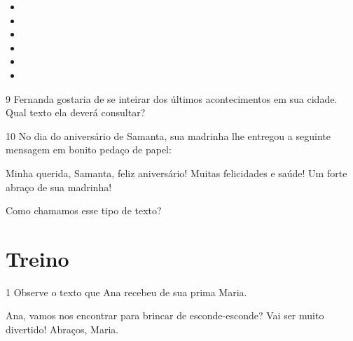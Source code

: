 \begin{itemize}
\item {}

\item \reduline{\mbox{}\hfill}

\item \reduline{\mbox{}\hfill}

\item \reduline{\mbox{}\hfill}

\item \reduline{\mbox{}\hfill}

\item \reduline{\mbox{}\hfill}

\end{itemize}

\num{9} Fernanda gostaria de se inteirar dos últimos acontecimentos em sua cidade. Qual texto ela deverá consultar?


\num{10} No dia do aniversário de Samanta, sua madrinha lhe entregou a seguinte mensagem em bonito pedaço de papel:
\begin{myquote}
\begin{centering}
Minha querida, Samanta, feliz aniversário! Muitas felicidades e saúde! Um forte abraço de sua madrinha!
\end{centering}
\end{myquote}
Como chamamos esse tipo de texto?


\section*{Treino}

\num{1} Observe o texto que Ana recebeu de sua prima Maria.

\begin{myquote}
\begin{center}
Ana, vamos nos encontrar para brincar de esconde-esconde? Vai ser muito divertido! Abraços, Maria.
\end{center}
\end{myquote}

